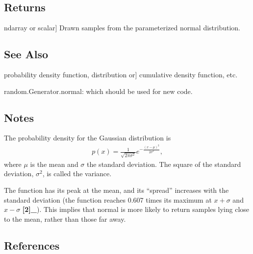 \documentclass[letterpaper,10pt,english]{sphinxmanual}
\begin{document}
\begin{fulllineitems}
\begin{description}
\end{description}


\subsection{Returns}
\label{\detokenize{myfpga:returns}}\begin{description}
\sphinxlineitem{out}{[}ndarray or scalar{]}
\sphinxAtStartPar
Drawn samples from the parameterized normal distribution.

\end{description}


\subsection{See Also}
\label{\detokenize{myfpga:see-also}}\begin{description}
\sphinxlineitem{scipy.stats.norm}{[}probability density function, distribution or{]}
\sphinxAtStartPar
cumulative density function, etc.

\end{description}

\sphinxAtStartPar
random.Generator.normal: which should be used for new code.


\subsection{Notes}
\label{\detokenize{myfpga:notes}}
\sphinxAtStartPar
The probability density for the Gaussian distribution is
\begin{equation*}
\begin{split}p(x) = \frac{1}{\sqrt{ 2 \pi \sigma^2 }}
e^{ - \frac{ (x - \mu)^2 } {2 \sigma^2} },\end{split}
\end{equation*}
\sphinxAtStartPar
where \(\mu\) is the mean and \(\sigma\) the standard
deviation. The square of the standard deviation, \(\sigma^2\),
is called the variance.

\sphinxAtStartPar
The function has its peak at the mean, and its “spread” increases with
the standard deviation (the function reaches 0.607 times its maximum at
\(x + \sigma\) and \(x - \sigma\) {\color{red}\bfseries{}{[}2{]}\_}).  This implies that
normal is more likely to return samples lying close to the mean, rather
than those far away.


\subsection{References}
\label{\detokenize{myfpga:references}}


\end{fulllineitems}
\end{document}
